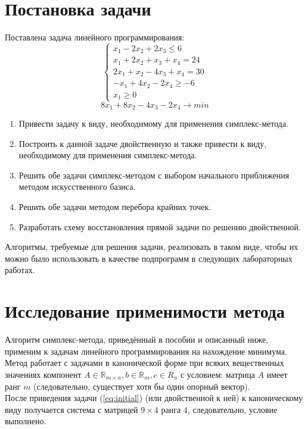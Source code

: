 \documentclass[main.tex]{subfiles}
\begin{document}
	
	\section{Постановка задачи}
	Поставлена задача линейного программирования:
	\begin{equation}\label{eq:initial}
	\left\{
	\begin{array}{ll} 
	x_1-2x_2+2x_3 \le 6\\
	x_1+2x_2+x_3+x_4=24\\
	2x_1+x_2-4x_3+x_4=30\\
	-x_1+4x_2-2x_4 \ge -6\\
	x_1 \ge 0
	\end{array}
	\right.
	\end{equation}
	$$ 8x_1 + 8x_2 - 4x_3 - 2x_4 \longrightarrow min $$
	\begin{enumerate}
		\item Привести задачу к виду, необходимому для применения симплекс-метода.
		\item Построить к данной задаче двойственную и также привести к виду, необходимому для применения симплекс-метода.
		\item Решить обе задачи симплекс-методом с выбором начального приближения методом искусственного базиса.
		\item Решить обе задачи методом перебора крайних точек.
		\item Разработать схему восстановления прямой задачи по решению двойственной.
	\end{enumerate}
	Алгоритмы, требуемые для решения задачи, реализовать в таком виде, чтобы их можно было использовать в качестве подпрограмм в следующих лабораторных работах.
	\section{Исследование применимости метода}
	Алгоритм симплекс-метода, приведённый в пособии \cite{petuh} и описанный ниже, применим к задачам линейного программирования на нахождение минимума. Метод работает с задачами в канонической форме при всяких вещественных значениях компонент $A \in \mathds{R}_{m\times n}, b \in \mathds{R}_m, c \in R_n$ с условием: матрица $A$ имеет ранг $m$ (следовательно, существует хотя бы один опорный вектор).\\
	После приведения задачи (\ref{eq:initial}) (или двойственной к ней) к каноническому виду получается система с матрицей $ 9 \times 4 $ ранга $4$, следовательно, условие выполнено.\\
	
\end{document}
